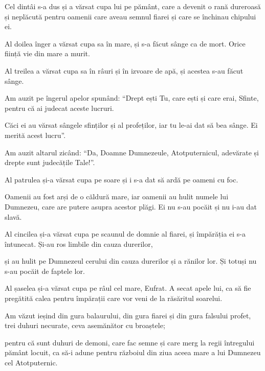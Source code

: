 {\par }{\PP {}Cel dintâi s-a dus și a vărsat cupa lui pe pământ, care a devenit o rană dureroasă și neplăcută pentru oamenii care aveau semnul fiarei și care se închinau chipului ei.


\par }{\PP {}Al doilea înger a vărsat cupa sa în mare, și s-a făcut sânge ca de mort. Orice ființă vie din mare a murit.


\par }{\PP {}Al treilea a vărsat cupa sa în râuri și în izvoare de apă, și acestea s-au făcut sânge.

Am auzit pe îngerul apelor spunând: “Drept ești Tu, care ești și care erai, Sfinte, pentru că ai judecat aceste lucruri.

Căci ei au vărsat sângele sfinților și al profeților, iar tu le-ai dat să bea sânge. Ei merită acest lucru”.


\par }{\PP {}Am auzit altarul zicând: “Da, Doamne Dumnezeule, Atotputernicul, adevărate și drepte sunt judecățile Tale!”.


\par }{\PP {}Al patrulea și-a vărsat cupa pe soare și i s-a dat să ardă pe oameni cu foc.

Oamenii au fost arși de o căldură mare, iar oamenii au hulit numele lui Dumnezeu, care are putere asupra acestor plăgi. Ei nu s-au pocăit și nu i-au dat slavă.


\par }{\PP {}Al cincilea și-a vărsat cupa pe scaunul de domnie al fiarei, și împărăția ei s-a întunecat. Și-au ros limbile din cauza durerilor,

și au hulit pe Dumnezeul cerului din cauza durerilor și a rănilor lor. Și totuși nu s-au pocăit de faptele lor.


\par }{\PP {}Al șaselea și-a vărsat cupa pe râul cel mare, Eufrat. A secat apele lui, ca să fie pregătită calea pentru împărații care vor veni de la răsăritul soarelui.

Am văzut ieșind din gura balaurului, din gura fiarei și din gura falsului profet, trei duhuri necurate, ceva asemănător cu broaștele;

pentru că sunt duhuri de demoni, care fac semne și care merg la regii întregului pământ locuit, ca să-i adune pentru războiul din ziua aceea mare a lui Dumnezeu cel Atotputernic.


}
